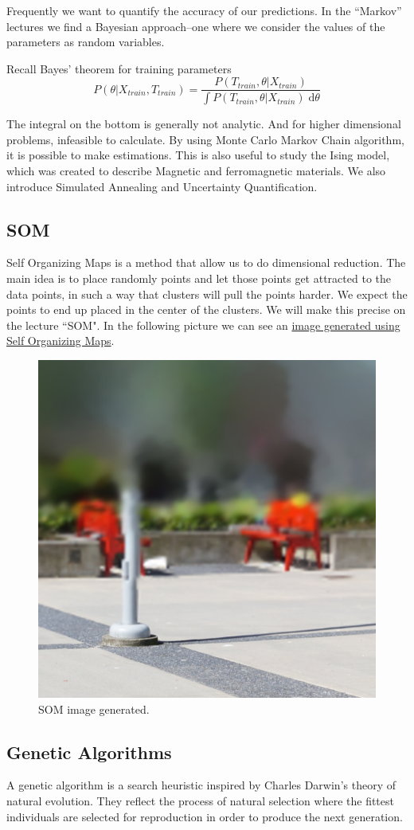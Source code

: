 \documentclass[11pt,letterpaper]{report}
\begin{document}
Frequently we want to quantify the accuracy of our predictions. In the ``Markov'' lectures we find a Bayesian approach--one where we consider the values of the parameters as random variables.

Recall Bayes' theorem for training parameters
\begin{equation}
P(\theta|X_{train}, T_{train}) = \frac{P(T_{train}, \theta|X_{train})}{\int P(T_{train}, \theta|X_{train})\;\mathrm{d}\theta} 
\end{equation}

The integral on the bottom is generally not analytic. And for higher dimensional problems, infeasible to calculate. By using Monte Carlo Markov Chain algorithm, it is possible to make estimations.  This is also useful to study   the Ising model, which was created to describe Magnetic and ferromagnetic materials. We also introduce Simulated Annealing and Uncertainty Quantification.
\subsection{SOM}
Self Organizing Maps is a method that allow us to do dimensional reduction. The main idea is to place randomly points and let those points get attracted to the data points, in such a way that clusters will pull the points harder. We expect the points to end up placed in the center of the clusters. We will make this precise on the lecture ``SOM". 
In the following picture we can see an \href{https://github.com/ANNetGPGPU/ANNetGPGPU}{ image
	generated using Self Organizing Maps}\cite{wsom}.

\begin{figure}[h!]
	\centering
	\includegraphics[width=0.45\linewidth]{figures/ex.jpg}
	\caption{SOM image generated.} 
	\label{fig:som}
\end{figure} 	

\subsection{Genetic Algorithms}
A genetic algorithm is a search heuristic  inspired by Charles Darwin’s theory of natural evolution. They reflect the process of natural selection where the fittest individuals are selected for reproduction in order to produce the next generation.
\end{document}
